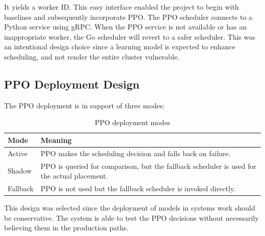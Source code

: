 It yields a worker ID. This easy interface enabled the project to begin with baselines and subsequently incorporate PPO. The PPO scheduler connects to a Python service using gRPC. When the PPO service is not available or has an inappropriate worker, the Go scheduler will revert to a safer scheduler. This was an intentional design choice since a learning model is expected to enhance scheduling, and not render the entire cluster vulnerable.

\subsection{PPO Deployment Design}

The PPO deployment is in support of three modes:

\begin{table}[H]
\centering
\caption{PPO deployment modes}
\label{tab:ppo_modes}
\begin{tabularx}{\textwidth}{lX}
\toprule
\textbf{Mode} & \textbf{Meaning} \\
\midrule
Active & PPO makes the scheduling decision and falls back on failure. \\
Shadow & PPO is queried for comparison, but the fallback scheduler is used for the actual placement. \\
Fallback & PPO is not used but the fallback scheduler is invoked directly. \\
\bottomrule
\end{tabularx}
\end{table}

This design was selected since the deployment of models in systems work should be conservative. The system is able to test the PPO decisions without necessarily believing them in the production paths.